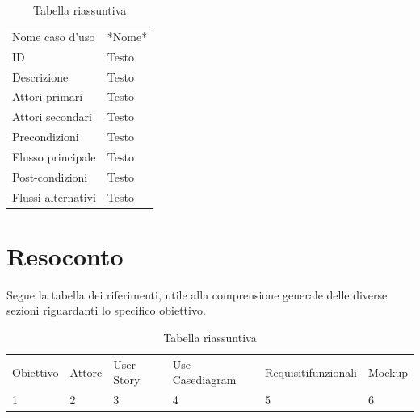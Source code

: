 \documentclass{article}
\begin{document}

\begin{table}[htbp]
    \centering
    \begin{tabularx}{\textwidth}{| l | p{} |}
        \Xhline{2pt} %
        Nome caso d'uso & *Nome* \\
        \Xhline{2pt} %
        ID & Testo \\
        \hline
        Descrizione & Testo \\
        \hline
        Attori primari & Testo \\
        \hline
        Attori secondari & Testo \\
        \hline
        Precondizioni & Testo \\
        \hline
        Flusso principale & Testo \\
        \hline
        Post-condizioni & Testo \\
        \hline
        Flussi alternativi & Testo \\
        \hline
    \end{tabularx}
    \caption{Tabella riassuntiva}
    \label{tab:tabella_use_case}
\end{table}

\clearpage

\section{Resoconto}

Segue la tabella dei riferimenti, utile alla comprensione generale delle diverse sezioni riguardanti lo specifico obiettivo.\\

\begin{table}[htbp]
    \centering
    \begin{tabularx}{\textwidth}{|X|X|X|X|X|X|}
        \Xhline{2pt} %
        Obiettivo & Attore & User Story & Use Case\newline diagram & Requisiti\newline funzionali & Mockup \\
        \Xhline{2pt} %
        1 & 2 & 3 & 4 & 5 & 6 \\
        \hline
    \end{tabularx}
    \caption{Tabella riassuntiva}
    \label{tab:tabella_tutta_pagina}
\end{table}
\end{document}
